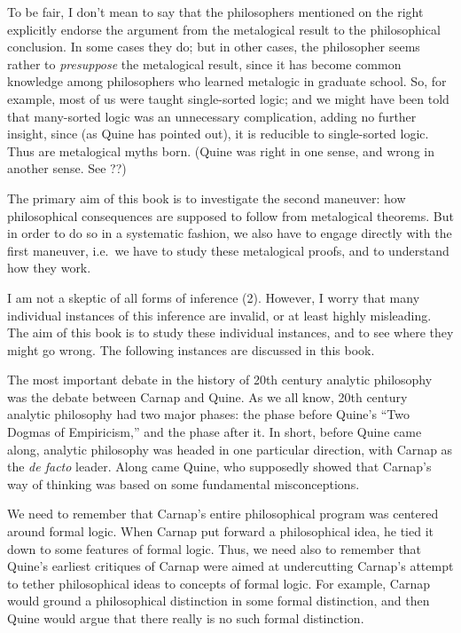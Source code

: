To be fair, I don't mean to say that the philosophers mentioned on the
right explicitly endorse the argument from the metalogical result to
the philosophical conclusion.  In some cases they do; but in other
cases, the philosopher seems rather to {\it presuppose} the
metalogical result, since it has become common knowledge among
philosophers who learned metalogic in graduate school.  So, for
example, most of us were taught single-sorted logic; and we might have
been told that many-sorted logic was an unnecessary complication,
adding no further insight, since (as Quine has pointed out), it is
reducible to single-sorted logic.  Thus are metalogical myths born.
(Quine was right in one sense, and wrong in another sense.  See ??)

The primary aim of this book is to investigate the second maneuver:
how philosophical consequences are supposed to follow from metalogical
theorems.  But in order to do so in a systematic fashion, we also have
to engage directly with the first maneuver, i.e.\ we have to study
these metalogical proofs, and to understand how they work.

I am not a skeptic of all forms of inference (2).  However, I worry
that many individual instances of this inference are invalid, or at
least highly misleading.  The aim of this book is to study these
individual instances, and to see where they might go wrong.  The
following instances are discussed in this book.

The most important debate in the history of 20th century analytic
philosophy was the debate between Carnap and Quine.  As we all know,
20th century analytic philosophy had two major phases: the phase
before Quine's ``Two Dogmas of Empiricism,'' and the phase after it.
In short, before Quine came along, analytic philosophy was headed in
one particular direction, with Carnap as the {\it de facto} leader.
Along came Quine, who supposedly showed that Carnap's way of thinking
was based on some fundamental misconceptions.

We need to remember that Carnap's entire philosophical program was
centered around formal logic.  When Carnap put forward a philosophical
idea, he tied it down to some features of formal logic.  Thus, we need
also to remember that Quine's earliest critiques of Carnap were aimed
at undercutting Carnap's attempt to tether philosophical ideas to
concepts of formal logic.  For example, Carnap would ground a
philosophical distinction in some formal distinction, and then Quine
would argue that there really is no such formal distinction.

